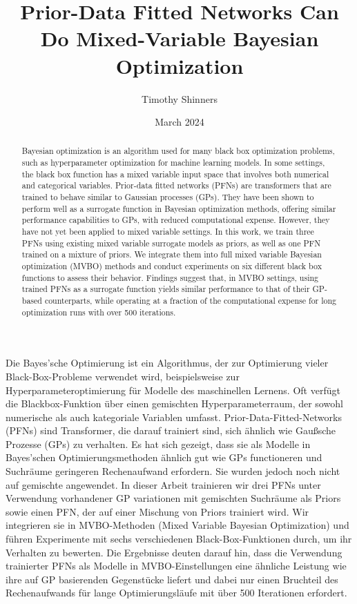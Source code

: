 \documentclass[12pt,twoside]{reedthesis}
\title{Prior-Data Fitted Networks Can Do Mixed-Variable Bayesian Optimization}
\author{Timothy Shinners}
\date{March 2024}
\begin{document}
  \maketitle

\frontmatter %
\pagestyle{empty} %
  \begin{abstract}
    Bayesian optimization is an algorithm used for many black box optimization problems, such as hyperparameter optimization for machine learning models. In some settings, the black box function has a mixed variable input space that involves both numerical and categorical variables. Prior-data fitted networks (PFNs) are transformers that are trained to behave similar to Gaussian processes (GPs). They have been shown to perform well as a surrogate function in Bayesian optimization methods, offering similar performance capabilities to GPs, with reduced computational expense. However, they have not yet been applied to mixed variable settings. In this work, we train three PFNs using existing mixed variable surrogate models as priors, as well as one PFN trained on a mixture of priors. We integrate them into full mixed variable Bayesian optimization (MVBO) methods and conduct experiments on six different black box functions to assess their behavior. Findings suggest that, in MVBO settings, using trained PFNs as a surrogate function yields similar performance to that of their GP-based counterparts, while operating at a fraction of the computational expense for long optimization runs with over 500 iterations.
  \end{abstract}
  \begin{kurzfassung}
    Die Bayes'sche Optimierung ist ein Algorithmus, der zur Optimierung vieler Black-Box-Probleme verwendet wird, beispielsweise zur Hyperparameteroptimierung für Modelle des maschinellen Lernens. Oft verfügt die Blackbox-Funktion über einen gemischten Hyperparameterraum, der sowohl numerische als auch kategoriale Variablen umfasst. Prior-Data-Fitted-Networks (PFNs) sind Transformer, die darauf trainiert sind, sich ähnlich wie Gaußsche Prozesse (GPs) zu verhalten. Es hat sich gezeigt, dass sie als Modelle in Bayes'schen Optimierungsmethoden ähnlich gut wie GPs functioneren und Suchräume geringeren Rechenaufwand erfordern. Sie wurden jedoch noch nicht auf gemischte angewendet. In dieser Arbeit trainieren wir drei PFNs unter Verwendung vorhandener GP variationen mit gemischten Suchräume als Priors sowie einen PFN, der auf einer Mischung von Priors trainiert wird. Wir integrieren sie in MVBO-Methoden (Mixed Variable Bayesian Optimization) und führen Experimente mit sechs verschiedenen Black-Box-Funktionen durch, um ihr Verhalten zu bewerten. Die Ergebnisse deuten darauf hin, dass die Verwendung trainierter PFNs als Modelle in MVBO-Einstellungen eine ähnliche Leistung wie ihre auf GP basierenden Gegenstücke liefert und dabei nur einen Bruchteil des Rechenaufwands für lange Optimierungsläufe mit über 500 Iterationen erfordert.
  \end{kurzfassung}
\end{document}
